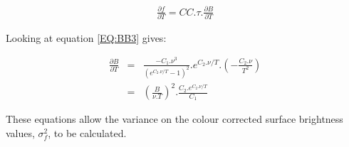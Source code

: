 \begin{eqnarray*}
\frac{\partial f}{\partial T} = CC.\tau.\frac{\partial B}{\partial T}
\end{eqnarray*}

Looking at equation \ref{EQ:BB3} gives:

\begin{eqnarray*}
\frac{\partial B}{\partial T} & = & \frac{-C_{1}.\nu^{3}}{(e^{C_{2}.\nu/T}-1)^{2}}.
                         e^{C_{2}.\nu/T}.\left(-\frac{C_{2}.\nu}{T^{2}}\right)\\
& = & \left(\frac{B}{\nu.T}\right)^{2}.\frac{C_{2}.e^{C_{2}.\nu/T}}{C_{1}}
\end{eqnarray*}

These equations allow the variance on the colour corrected surface brightness 
values, $\sigma_{f}^{2}$, to be calculated.


